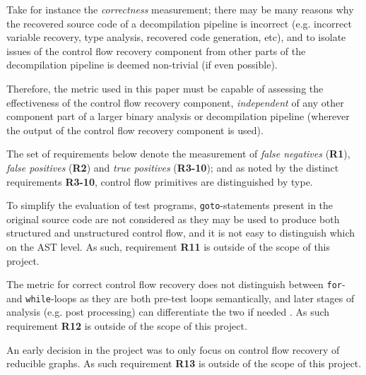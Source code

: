 Take for instance the \textit{correctness} measurement; there may be many reasons why the recovered source code of a decompilation pipeline is incorrect (e.g. incorrect variable recovery, type analysis, recovered code generation, etc), and to isolate issues of the control flow recovery component from other parts of the decompilation pipeline is deemed non-trivial (if even possible).

Therefore, the metric used in this paper must be capable of assessing the effectiveness of the control flow recovery component, \textit{independent} of any other component part of a larger binary analysis or decompilation pipeline (wherever the output of the control flow recovery component is used).

The set of requirements below denote the measurement of \textit{false negatives} (\textbf{R1}), \textit{false positives} (\textbf{R2}) and \textit{true positives} (\textbf{R3-10}); and as noted by the distinct requirements \textbf{R3-10}, control flow primitives are distinguished by type.

To simplify the evaluation of test programs, \texttt{goto}-statements present in the original source code are not considered as they may be used to produce both structured and unstructured control flow, and it is not easy to distinguish which on the AST level. As such, requirement \textbf{R11} is outside of the scope of this project.

The metric for correct control flow recovery does not distinguish between \texttt{for}- and \texttt{while}-loops as they are both pre-test loops semantically, and later stages of analysis (e.g. post processing) can differentiate the two if needed \cite{no_more_gotos}. As such requirement \textbf{R12} is outside of the scope of this project.

An early decision in the project was to only focus on control flow recovery of reducible graphs. As such requirement \textbf{R13} is outside of the scope of this project.

